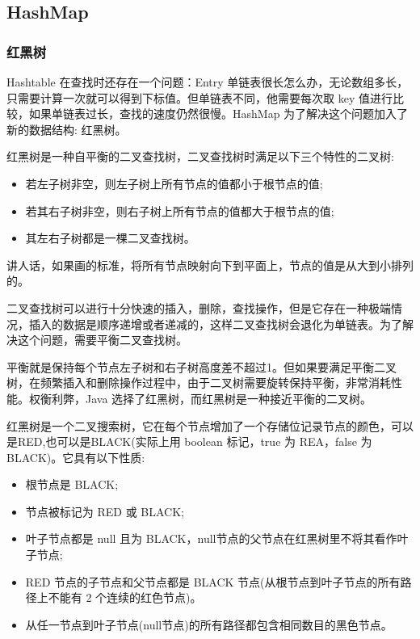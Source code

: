 \subsection{HashMap}

\subsubsection{红黑树}


Hashtable 在查找时还存在一个问题：Entry 单链表很长怎么办，无论数组多长，只需要计算一次就可以得到下标值。但单链表不同，他需要每次取 key 值进行比较，如果单链表过长，查找的速度仍然很慢。HashMap 为了解决这个问题加入了新的数据结构: 红黑树。

红黑树是一种自平衡的二叉查找树，二叉查找树时满足以下三个特性的二叉树:
\begin{itemize}
    \item 若左子树非空，则左子树上所有节点的值都小于根节点的值;
    \item 若其右子树非空，则右子树上所有节点的值都大于根节点的值;
    \item 其左右子树都是一棵二叉查找树。
\end{itemize}

讲人话，如果画的标准，将所有节点映射向下到平面上，节点的值是从大到小排列的。

二叉查找树可以进行十分快速的插入，删除，查找操作，但是它存在一种极端情况，插入的数据是顺序递增或者递减的，这样二叉查找树会退化为单链表。为了解决这个问题，需要平衡二叉查找树。

平衡就是保持每个节点左子树和右子树高度差不超过1。但如果要满足平衡二叉树，在频繁插入和删除操作过程中，由于二叉树需要旋转保持平衡，非常消耗性能。权衡利弊，Java 选择了红黑树，而红黑树是一种接近平衡的二叉树。

红黑树是一个二叉搜索树，它在每个节点增加了一个存储位记录节点的颜色，可以是RED,也可以是BLACK(实际上用 boolean 标记，true 为 REA，false 为 BLACK)。它具有以下性质:

\begin{itemize}
    \item 根节点是 BLACK;
    \item 节点被标记为 RED 或 BLACK;
    \item 叶子节点都是 null 且为 BLACK，null节点的父节点在红黑树里不将其看作叶子节点;
    \item RED 节点的子节点和父节点都是 BLACK 节点(从根节点到叶子节点的所有路径上不能有 2 个连续的红色节点)。
    \item 从任一节点到叶子节点(null节点)的所有路径都包含相同数目的黑色节点。
\end{itemize}

